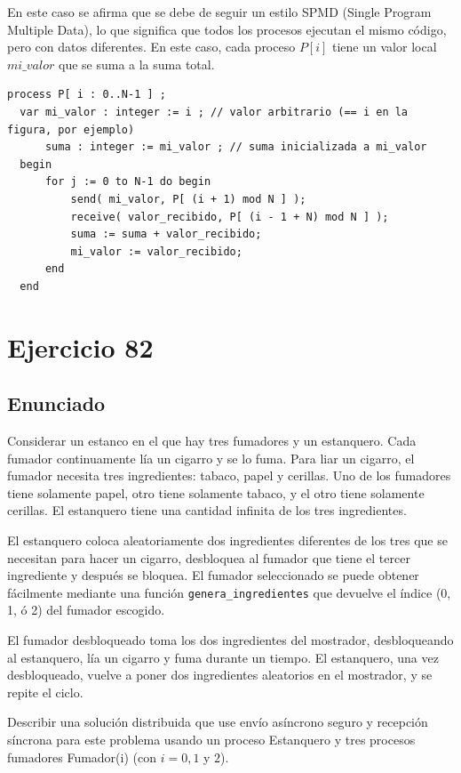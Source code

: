 \documentclass[a4paper,12pt]{article}
\begin{document}
En este caso se afirma que se debe de seguir un estilo SPMD (Single Program Multiple Data), lo que significa que todos los procesos ejecutan el mismo código, pero con datos diferentes. En este caso, cada proceso $P[i]$ tiene un valor local $mi\_valor$ que se suma a la suma total.

\begin{lstlisting}[style=customcpp]
  process P[ i : 0..N-1 ] ;
  var mi_valor : integer := i ; // valor arbitrario (== i en la figura, por ejemplo)
      suma : integer := mi_valor ; // suma inicializada a mi_valor
  begin
      for j := 0 to N-1 do begin
          send( mi_valor, P[ (i + 1) mod N ] );
          receive( valor_recibido, P[ (i - 1 + N) mod N ] );
          suma := suma + valor_recibido;
          mi_valor := valor_recibido; 
      end
  end
\end{lstlisting}

\section{Ejercicio 82}

\subsection{Enunciado}

Considerar un estanco en el que hay tres fumadores y un estanquero. Cada fumador continuamente lía un cigarro y se lo fuma. Para liar un cigarro, el fumador necesita tres ingredientes: tabaco, papel y cerillas. Uno de los fumadores tiene solamente papel, otro tiene solamente tabaco, y el otro tiene solamente cerillas. El estanquero tiene una cantidad infinita de los tres ingredientes.

El estanquero coloca aleatoriamente dos ingredientes diferentes de los tres que se necesitan para hacer un cigarro, desbloquea al fumador que tiene el tercer ingrediente y después se bloquea. El fumador seleccionado se puede obtener fácilmente mediante una función \texttt{genera\_ingredientes} que devuelve el índice (0, 1, ó 2) del fumador escogido.

El fumador desbloqueado toma los dos ingredientes del mostrador, desbloqueando al estanquero, lía un cigarro y fuma durante un tiempo. El estanquero, una vez desbloqueado, vuelve a poner dos ingredientes aleatorios en el mostrador, y se repite el ciclo.

Describir una solución distribuida que use envío asíncrono seguro y recepción síncrona para este problema usando un proceso Estanquero y tres procesos fumadores Fumador(i) (con $i=0,1$ y $2$).
\end{document}
